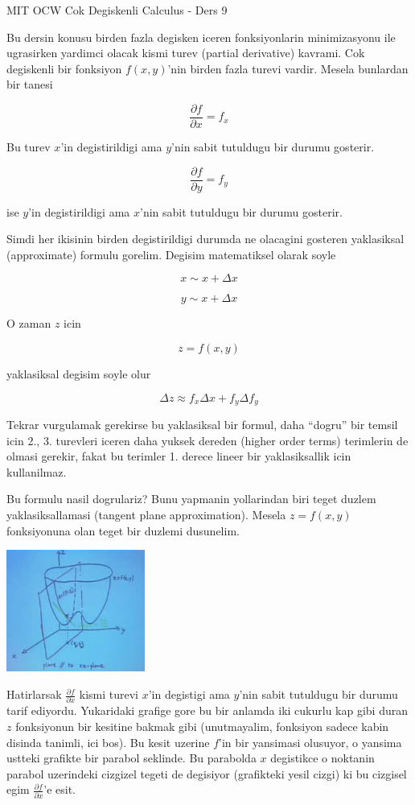 \documentclass[12pt,fleqn]{article}
\begin{document}
MIT OCW Cok Degiskenli Calculus - Ders 9

Bu dersin konusu birden fazla degisken iceren fonksiyonlarin minimizasyonu
ile ugrasirken yardimci olacak kismi turev (partial derivative)
kavrami. Cok degiskenli bir fonksiyon $f(x,y)$'nin birden fazla turevi
vardir. Mesela bunlardan bir tanesi

\[ \frac{\partial f}{\partial x} = f_x \]

Bu turev $x$'in degistirildigi ama $y$'nin sabit tutuldugu bir durumu
gosterir. 

\[ \frac{\partial f}{\partial y} = f_y \]

ise $y$'in degistirildigi ama $x$'nin sabit tutuldugu bir durumu gosterir.

Simdi her ikisinin birden degistirildigi durumda ne olacagini gosteren
yaklasiksal (approximate) formulu gorelim. Degisim matematiksel olarak
soyle

\[ x \sim x + \Delta x \]

\[ y \sim x + \Delta x \]

O zaman $z$ icin

\[ z = f(x,y) \]

yaklasiksal degisim soyle olur

\begin{equation}\label{eq1}
\Delta z \approx f_x\Delta x + f_y \Delta f_y
\end{equation}


Tekrar vurgulamak gerekirse bu yaklasiksal bir formul, daha ``dogru'' bir
temsil icin 2., 3. turevleri iceren daha yuksek dereden (higher order
terms) terimlerin de olmasi gerekir, fakat bu terimler 1. derece lineer bir
yaklasiksallik icin kullanilmaz. 

Bu formulu nasil dogrulariz? Bunu yapmanin yollarindan biri teget duzlem
yaklasiksallamasi (tangent plane approximation). Mesela $z = f(x,y)$
fonksiyonuna olan teget bir duzlemi dusunelim.

\includegraphics[height=4cm]{9_1.png}

Hatirlarsak $\frac{\partial f}{\partial x}$ kismi turevi $x$'in degistigi
ama $y$'nin sabit tutuldugu bir durumu tarif ediyordu. Yukaridaki grafige
gore bu bir anlamda iki cukurlu kap gibi duran $z$ fonksiyonun bir kesitine
bakmak gibi (unutmayalim, fonksiyon sadece kabin disinda tanimli, ici
bos). Bu kesit uzerine $f$'in bir yansimasi olusuyor, o yansima ustteki
grafikte bir parabol seklinde. Bu parabolda $x$ degistikce o noktanin
parabol uzerindeki cizgizel tegeti de degisiyor (grafikteki yesil cizgi) ki
bu cizgisel egim $\frac{\partial f}{\partial x}$'e esit.
\end{document}
